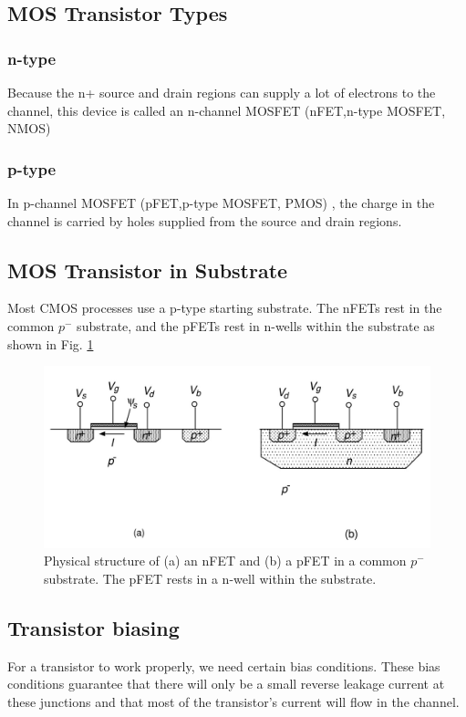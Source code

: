 \documentclass[main]{subfiles}
\begin{document}
\subsection{MOS Transistor Types}
\subsubsection{n-type}
    Because the n+ source and drain regions can supply a lot of electrons to the channel, this device is called an n-channel MOSFET (nFET,n-type MOSFET, NMOS) \cite{book:VLSI}
\subsubsection{p-type}
   In p-channel MOSFET (pFET,p-type MOSFET, PMOS) , the charge in the channel is carried by holes supplied from the source and drain regions.
    
\bigskip\subsection{MOS Transistor in Substrate}
Most CMOS processes use a p-type starting substrate.  The nFETs rest in the common $p^-$ substrate, and the pFETs rest in
n-wells within the substrate as shown in Fig. \ref{fig:MOSFET_Physical_Structure}

\begin{figure}[H]
  \centering
  \includegraphics[scale=0.8]{figs/MOSFET_Physical_structure.jpg}
  \caption{Physical structure of (a) an nFET and (b) a pFET in a common $p^-$ substrate. The pFET rests in a n-well within the substrate. \cite{book:VLSI}}
  \label{fig:MOSFET_Physical_Structure}
\end{figure}

\subsection{Transistor biasing}
For a transistor to work properly, we need certain bias conditions.
These bias conditions guarantee that there will only be a small reverse leakage current at these junctions and that most of the transistor’s current will flow in the channel.
\end{document}
